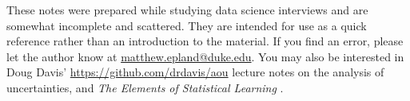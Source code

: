 \preface

These notes were prepared while studying data science interviews and are somewhat incomplete and scattered.
They are intended for use as a quick reference rather than an introduction to the material.
If you find an error, please let the author know at \href{mailto:matthew.epland@duke.edu}{matthew.epland@duke.edu}.
You may also be interested in Doug Davis' \url{https://github.com/drdavis/aou} lecture notes on the analysis of uncertainties,
and \textit{The Elements of Statistical Learning} \cite{HastieTF09}.
